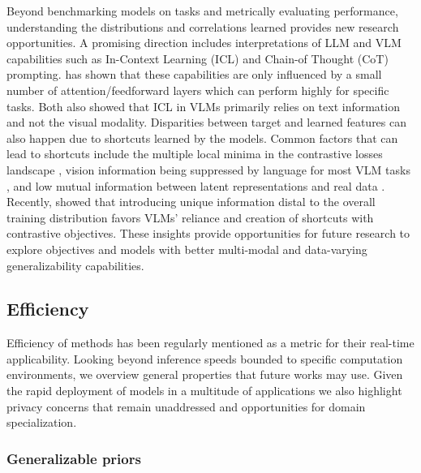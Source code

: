 Beyond benchmarking models on tasks and metrically evaluating performance, understanding the distributions and correlations learned provides new research opportunities. A promising direction includes interpretations of LLM and VLM capabilities such as In-Context Learning (ICL) \citep{brown2020language,hoffmann2022empirical} and Chain-of Thought (CoT) \citep{wei2022chain} prompting. \citet{bansal2023rethinking} has shown that these capabilities are only influenced by a small number of attention/feedforward layers which can perform highly for specific tasks. Both \citet{baldassini2024makes,chen2024understanding} also showed that ICL in VLMs primarily relies on text information and not the visual modality. Disparities between target and learned features can also happen due to shortcuts learned by the models. Common factors that can lead to shortcuts include
the multiple local minima in the contrastive losses landscape \citep{robinson2021can}, vision information being suppressed by language for most VLM tasks \citep{li2023addressing}, and low mutual information between latent representations and real data \citep{adnan2022monitoring}. Recently, \citet{bleeker2024demonstrating} showed that introducing unique information distal to the overall training distribution favors VLMs' reliance and creation of shortcuts with contrastive objectives. These insights provide opportunities for future research to explore objectives and models with better multi-modal and data-varying generalizability capabilities.



\subsection{Efficiency}
\label{sec:outlook::efficiency}

Efficiency of methods has been regularly mentioned as a metric for their real-time applicability. Looking beyond inference speeds bounded to specific computation environments, we overview general properties that future works may use. Given the rapid deployment of models in a multitude of applications we also highlight privacy concerns that remain unaddressed and opportunities for domain specialization.  

\subsubsection{Generalizable priors}

